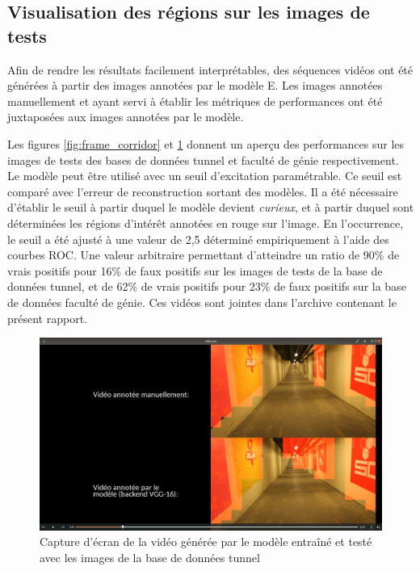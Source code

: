 \subsection{Visualisation des régions sur les images de tests}
    Afin de rendre les résultats facilement interprétables, des séquences vidéos ont été générées à partir des images annotées par le modèle E. Les images annotées manuellement et ayant servi à établir les métriques de performances ont été juxtaposées aux images annotées par le modèle.
    \bigskip

    Les figures \ref{fig:frame_corridor} et \ref{fig:frame_tunnel} donnent un aperçu des performances sur les images de tests des bases de données tunnel et faculté de génie respectivement. Le modèle peut être utilisé avec un seuil d'excitation paramétrable. Ce seuil est comparé avec l'erreur de reconstruction sortant des modèles. Il a été nécessaire d'établir le seuil à partir duquel le modèle devient \textit{curieux}, et à partir duquel sont déterminées les régions d’intérêt annotées en rouge sur l'image. En l’occurrence, le seuil a été ajusté à une valeur de 2,5 déterminé empiriquement à l'aide des courbes ROC. Une valeur arbitraire permettant d'atteindre un ratio de 90\% de vrais positifs pour 16\% de faux positifs sur les images de tests de la base de données tunnel, et de 62\% de vrais positifs pour 23\% de faux positifs sur la base de données faculté de génie. Ces vidéos sont jointes dans l'archive contenant le présent rapport.
    \bigskip

    \begin{figure}
        \centering
        \includegraphics[width=17cm]{images/frame_tunnel.png}
        \caption{Capture d'écran de la vidéo générée par le modèle entraîné et testé avec les images de la base de données tunnel}
        \label{fig:frame_tunnel}
    \end{figure}

